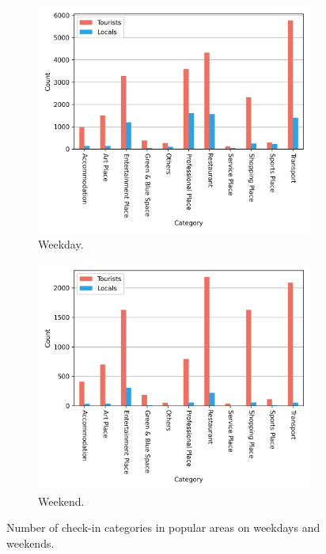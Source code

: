 \documentclass{article}
\theoremstyle{definition}
\theoremstyle{remark}
\begin{document}
\begin{figure}[!h]

\begin{subfigure}{0.5\textwidth}
\includegraphics[width=1\linewidth]{figures/diff_pop_category_weekday.png} 
\caption{Weekday.}
\label{fig:diff_pop_category_weekday}
\end{subfigure}
\begin{subfigure}{0.5\textwidth}
\includegraphics[width=1\linewidth]{figures/diff_pop_category_weekend.png}
\caption{Weekend.}
\label{fig:diff_pop_category_weekend}
\end{subfigure}

\caption{Number of check-in categories in popular areas on weekdays and weekends.} \label{fig:diff_pop_category_week}
\end{figure}
\end{document}
